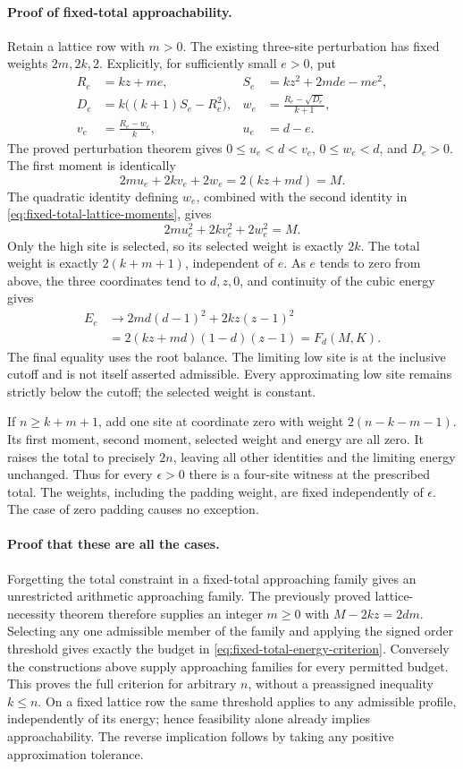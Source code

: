 \paragraph{Proof of fixed-total approachability.}
Retain a lattice row with \(m>0\).  The existing three-site perturbation
has fixed weights \(2m,2k,2\).  Explicitly, for sufficiently small
\(e>0\), put
\begin{align*}
 R_e&=kz+me,& S_e&=kz^2+2mde-me^2,\\
 D_e&=k\bigl((k+1)S_e-R_e^2\bigr),&
 w_e&=\frac{R_e-\sqrt{D_e}}{k+1},\\
 v_e&=\frac{R_e-w_e}{k},&u_e&=d-e.
\end{align*}
The proved perturbation theorem gives
\(0\le u_e<d<v_e\), \(0\le w_e<d\), and \(D_e>0\).
The first moment is identically
\[
 2m u_e+2k v_e+2w_e=2(kz+md)=M.
\]
The quadratic identity defining \(w_e\), combined with the second
identity in \eqref{eq:fixed-total-lattice-moments}, gives
\[
 2m u_e^2+2k v_e^2+2w_e^2=M.
\]
Only the high site is selected, so its selected weight is exactly \(2k\).
The total weight is exactly \(2(k+m+1)\), independent of \(e\).
As \(e\) tends to zero from above, the three coordinates tend to
\(d,z,0\), and continuity of the cubic energy gives
\begin{align*}
 E_e&\longrightarrow 2md(d-1)^2+2kz(z-1)^2\\
    &=2(kz+md)(1-d)(z-1)=F_d(M,K).
\end{align*}
The final equality uses the root balance.  The limiting low site is at the
inclusive cutoff and is not itself asserted admissible.  Every approximating
low site remains strictly below the cutoff; the selected weight is constant.

If \(n\ge k+m+1\), add one site at coordinate zero with weight
\(2(n-k-m-1)\).  Its first moment, second moment, selected weight and
energy are all zero.  It raises the total to precisely \(2n\), leaving
all other identities and the limiting energy unchanged.  Thus for every
\(\epsilon>0\) there is a four-site witness at the prescribed total.
The weights, including the padding weight, are fixed independently of
\(\epsilon\).  The case of zero padding causes no exception.

\paragraph{Proof that these are all the cases.}
Forgetting the total constraint in a fixed-total approaching family gives
an unrestricted arithmetic approaching family.  The previously proved
lattice-necessity theorem therefore supplies an integer \(m\ge0\)
with \(M-2kz=2dm\).  Selecting any one admissible member of the family
and applying the signed order threshold gives exactly the budget in
\eqref{eq:fixed-total-energy-criterion}.  Conversely the constructions
above supply approaching families for every permitted budget.  This proves
the full criterion for arbitrary \(n\), without a preassigned inequality
\(k\le n\).  On a fixed lattice row the same threshold applies to any
admissible profile, independently of its energy; hence feasibility alone
already implies approachability.  The reverse implication follows by taking
any positive approximation tolerance.

